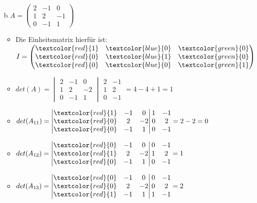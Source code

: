 \documentclass{article}
\begin{document}
\begin{itemize}
\begin{itemize}
\begin{itemize}
			\end{itemize}
			\item[b]{$A=\begin{pmatrix} 2 & -1 & 0 \\ 1 & 2 & -1 \\ 0 & -1 & 1 \end{pmatrix}$}
			\begin{itemize}
				\item{Die Einheitsmatrix hierfür ist: $I=\begin{pmatrix} \textcolor{red}{1} & \textcolor{blue}{0} & \textcolor{green}{0} \\ \textcolor{red}{0} & \textcolor{blue}{1} & \textcolor{green}{0} \\ \textcolor{red}{0} & \textcolor{blue}{0} & \textcolor{green}{1} \end{pmatrix}$}
				\item{$det(A)=\begin{vmatrix} 2 & -1 & 0 \\ 1 & 2 & -2 \\ 0 & -1 & 1 \end{vmatrix}\begin{matrix} 2 & -1 \\ 1 & 2 \\ 0 & -1 \end{matrix}=4-4+1=1$}
				\item{$det(A_{11})=\begin{vmatrix} \textcolor{red}{1} & -1 & 0 \\ \textcolor{red}{0} & 2 & -2 \\ \textcolor{red}{0} & -1 & 1 \end{vmatrix}\begin{matrix} 1 & -1 \\ 0 & 2 \\ 0 & -1 \end{matrix}=2-2=0$}
				\item{$det(A_{12})=\begin{vmatrix} \textcolor{red}{0} & -1 & 0 \\ \textcolor{red}{1} & 2 & -2 \\ \textcolor{red}{0} & -1 & 1 \end{vmatrix}\begin{matrix} 0 & -1 \\ 1 & 2 \\ 0 & -1 \end{matrix}=1$}
				\item{$det(A_{13})=\begin{vmatrix} \textcolor{red}{0} & -1 & 0 \\ \textcolor{red}{0} & 2 & -2 \\ \textcolor{red}{1} & -1 & 1 \end{vmatrix}\begin{matrix} 0 & -1 \\ 0 & 2 \\ 1 & -1 \end{matrix}=2$}

\end{itemize}
\end{itemize}
\end{itemize}
\end{document}
